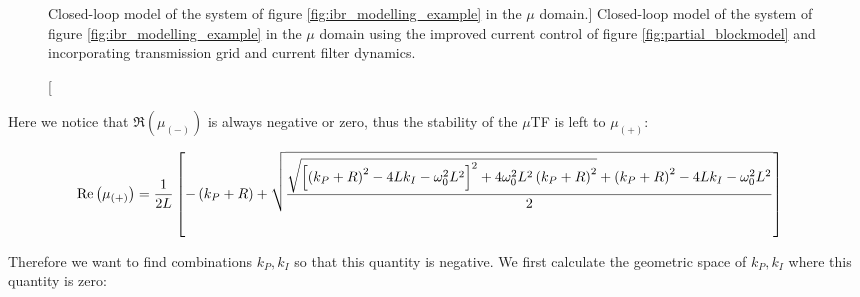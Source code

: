 \begin{figure}[t]
{
}
\caption
[Closed-loop model of the system of figure \ref{fig:ibr_modelling_example} in the $\mu$ domain.]
{Closed-loop model of the system of figure \ref{fig:ibr_modelling_example} in the $\mu$ domain using the improved current control of figure \ref{fig:partial_blockmodel} and incorporating transmission grid and current filter dynamics.}
\label{fig:complete_blockmodel}
\end{figure}

	Here we notice that $\Re\left(\mu_{(-)}\right)$ is always negative or zero, thus the stability of the $\mu$TF is left to $\mu_{(+)}$:

\footnotesize
\begin{equation}
	\hspace{-4mm} \Re\left(\mu_{(+)}\right) = \dfrac{1}{2L} \left[ -\left(k_P + R\right) + \sqrt{\dfrac{ \sqrt{\left[\left(k_P + R\right)^2 - 4Lk_I - \omega_0^2L^2\right]^2 + 4\omega_0^2 L^2 \left(k_P + R\right)^2} + \left(k_P + R\right)^2 - 4Lk_I - \omega_0^2L^2}{2}}\right]
\end{equation}
\normalsize

	Therefore we want to find combinations $k_P,k_I$ so that this quantity is negative. We first calculate the geometric space of $k_P,k_I$ where this quantity is zero:

